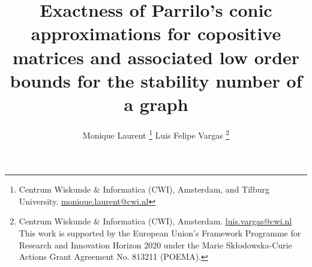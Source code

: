 \documentclass[11pt]{article}
\title{Exactness of Parrilo's conic approximations for copositive matrices and associated low order  bounds for the stability number of a graph }
\author {Monique Laurent
\thanks{Centrum Wiskunde \& Informatica (CWI), Amsterdam, and Tilburg University. \url{monique.laurent@cwi.nl} }
\And 
Luis Felipe Vargas
\thanks{Centrum Wiskunde \& Informatica (CWI), Amsterdam. \url{luis.vargas@cwi.nl}
\newline
This work is supported by the European Union's Framework Programme for Research and Innovation Horizon
2020 under the Marie Skłodowska-Curie Actions Grant Agreement No. 813211  (POEMA).
} 
}
\newcommand{\oN}{{\mathbb N}}
\newcommand{\ignore}[1]{}
\numberwithin{equation}{section}
\newcommand{\COP}{{\text{\rm COP}}}
\newcommand{\MK}{{\mathcal K}}
\begin{document}
\maketitle



\begin{abstract}
\ignore{De Klerk and Pasechnik (2002) proposed a hierarchy of bounds $\vartheta^{(r)}(G)$ ($r\in \oN$) for  the stability number $\alpha(G)$ of a graph $G$ and conjectured  it is exact at order $\alpha(G)-1$, i.e., $\vartheta^{(\alpha(G)-1)}(G)=\alpha(G)$.  This hierarchy relies on the cones $\MK_n^{(r)}$ proposed by Parrilo (2000) for approximating the copositive cone $\COP_n$.
A difficulty in understanding the convergence behaviour of  $\vartheta^{(r)}$ is that the cones $\MK_n^{(r)}$ are not well-behaved under simple operations: we show that adding a zero row/column to a matrix in $ \COP_n\setminus \MK^{(0)}_n$ gives a matrix in
$\COP_{n+1}\setminus \bigcup_{r\ge 0}\MK^{(r)}_{n+1}$, thereby 
disproving a conjecture of Dickinson et al. (2013)  claiming that every copositive matrix with 0-1 diagonal entries belongs to some  $\MK_n^{(r)}$. This also shows that the union of the cones $\MK^{(r)}_n$ is a strict subset of $\COP_n$ for any $n\ge 6$. %
We investigate the graphs for which the  bounds $\vartheta^{(0)}(G)$ and $\vartheta^{(1)}(G)$ are exact.
We give an algorithmic procedure that reduces the task of testing whether $\vartheta^{(0)}$ is exact to the class of acritical graphs, and we characterize the critical graphs with this property.
We also exhibit  a class of graphs for which  exactness of the bound $\vartheta^{(1)}$ is not preserved under the operation of adding an isolated node, thereby disproving a conjecture by Gvozdenovic and Laurent (2007) which, if true, would have directly implied the above conjecture by de Klerk and Pasechnik. 
}
\end{abstract}
\end{document}
